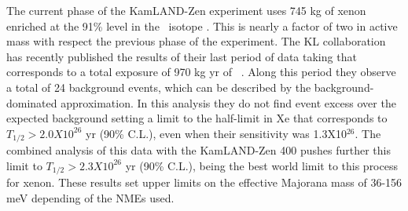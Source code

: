The current phase of the KamLAND-Zen experiment uses 745 kg of xenon enriched at the 91\% level in the \XE\ isotope \cite{https://arxiv.org/abs/2203.02139}. This is nearly a factor of two in active mass with respect the previous phase of the experiment. The KL collaboration has recently published the results of their last period of data taking \cite{https://arxiv.org/abs/2203.02139} that corresponds to a total exposure of 970 kg yr of \XE\ . Along this period they observe a total of 24 background events, which can be described by the background-dominated approximation. In this analysis they do not find event excess over the expected background setting a limit to the  half-limit in Xe that corresponds to $T_{1/2} > 2.0X10^{26}$ yr (90\% C.L.), even when their sensitivity was 1.3X10$^{26}$. The combined analysis of this data with the KamLAND-Zen 400 pushes further this limit to $T_{1/2} > 2.3X10^{26}$ yr (90\% C.L.), being the best world limit to this process for xenon.
These results set upper limits on the effective Majorana mass of 36-156 meV depending of the NMEs used.
